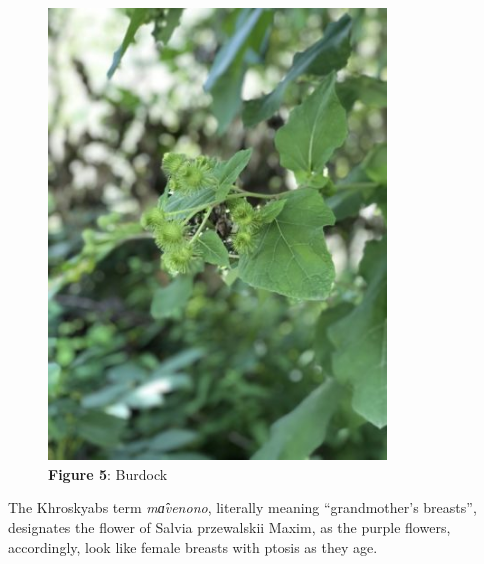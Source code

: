 \documentclass[
  a4paper,
  14pt,
  oneside,
  tablecaptionabove
]{scrbook}
\begin{document}
\begin{figure}[h!]
\centering
\includegraphics[width=0.8\textwidth]{images/IMG_7164-e1575732684598-375x500.jpg}
\captionsetup{labelformat=empty}
\caption{\textbf{Figure 5}: Burdock}
\end{figure}


The Khroskyabs term \emph{mɑ̂venono}, literally meaning
\enquote{grandmother's breasts}, designates the flower of Salvia
przewalskii Maxim, as the purple flowers, accordingly, look like female
breasts with ptosis as they age.
\end{document}
